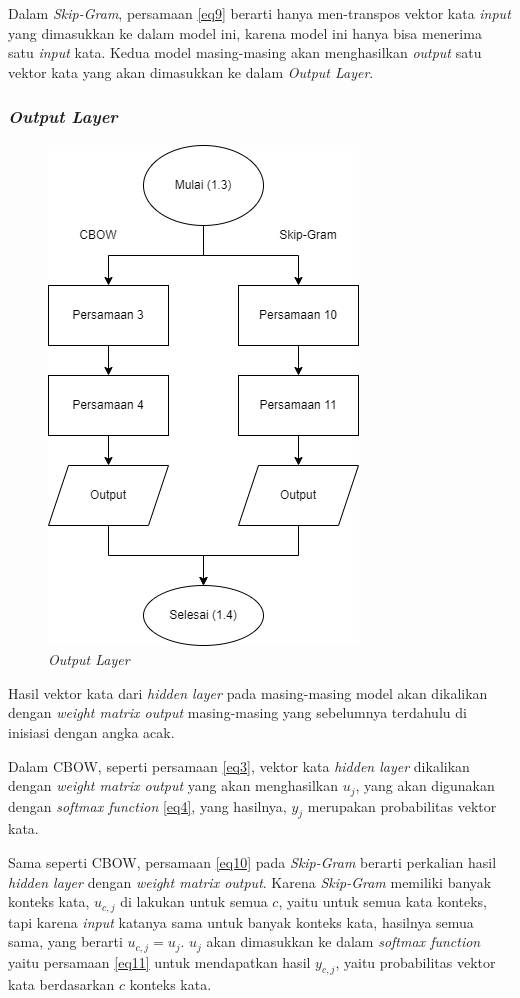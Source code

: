 \documentclass[12pt]{report}
\begin{document}
Dalam \textit{Skip-Gram}, persamaan \eqref{eq9} berarti hanya men-transpos vektor kata \textit{input} yang dimasukkan ke dalam model ini, karena model ini hanya bisa menerima satu \textit{input} kata. Kedua model masing-masing akan menghasilkan \textit{output} satu vektor kata yang akan dimasukkan ke dalam \textit{Output Layer}.

\subsubsection{\textit{Output Layer}}
\begin{figure}[H]
\centering
\includegraphics[scale=0.75]{outputlayerrev3}
\caption{\textit{Output Layer}}
\label{outputlayer}
\end{figure}
Hasil vektor kata dari \textit{hidden layer} pada masing-masing model akan dikalikan dengan \textit{weight matrix output} masing-masing yang sebelumnya terdahulu di inisiasi dengan angka acak.

Dalam CBOW, seperti persamaan \eqref{eq3}, vektor kata \textit{hidden layer} dikalikan dengan \textit{weight matrix output} yang akan menghasilkan $u_j$, yang akan digunakan dengan \textit{softmax function} \eqref{eq4}, yang hasilnya, $y_j$ merupakan probabilitas vektor kata. 

Sama seperti CBOW, persamaan \eqref{eq10} pada \textit{Skip-Gram} berarti perkalian hasil \textit{hidden layer} dengan \textit{weight matrix output}. Karena \textit{Skip-Gram} memiliki banyak konteks kata, $u_{c,j}$ di lakukan untuk semua $c$, yaitu untuk semua kata konteks, tapi karena \textit{input} katanya sama untuk banyak konteks kata, hasilnya semua sama, yang berarti $u_{c,j} = u_j$. $u_j$ akan dimasukkan ke dalam \textit{softmax function} yaitu persamaan \eqref{eq11} untuk mendapatkan hasil $y_{c,j}$, yaitu probabilitas vektor kata berdasarkan $c$ konteks kata.
\end{document}
